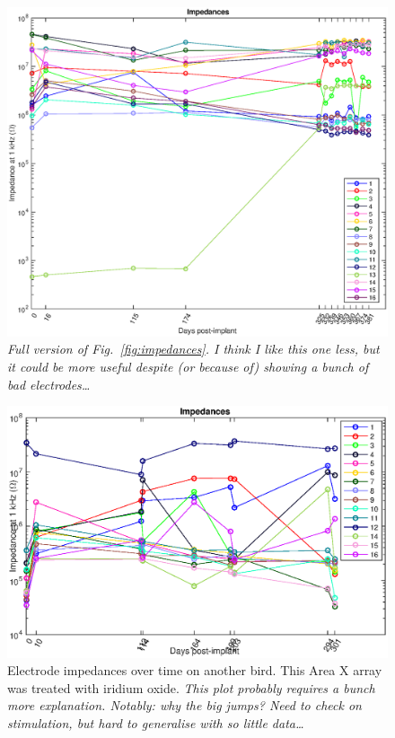 \documentclass[10pt,letterpaper]{article}
\newcommand\fig[1]{Fig.~\ref{#1}}
\begin{document}
\begin{figure}
  \includegraphics[width=\textwidth]{Impedances-all}
  \caption{{\em Full version of \fig{fig:impedances}.  I think I like this one less, but it could be more useful despite (or because of) showing a bunch of bad electrodes\dots}}
  \label{fig:impedances-all}
\end{figure}


\begin{figure}
  \includegraphics[width=\textwidth]{Impedances-lw95rhp}
  \caption{Electrode impedances over time on another bird.  This Area X array was treated with iridium oxide.  {\em This plot probably requires a bunch more explanation.  Notably: why the big jumps?  Need to check on stimulation, but hard to generalise with so little data\dots}}
  \label{fig:impedances-lw95rhp}
\end{figure}
\end{document}
